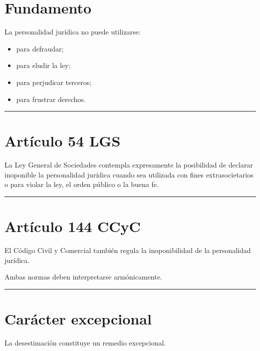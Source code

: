 \documentclass[
  spanish,
  letterpaper,
  DIV=11,
  numbers=noendperiod]{scrartcl}
\providecommand{\tightlist}{%
  \setlength{\itemsep}{0pt}\setlength{\parskip}{0pt}}
\begin{document}
\section{Fundamento}\label{fundamento}

La personalidad jurídica no puede utilizarse:

\begin{itemize}
\tightlist
\item
  para defraudar;
\item
  para eludir la ley;
\item
  para perjudicar terceros;
\item
  para frustrar derechos.
\end{itemize}

\begin{center}\rule{0.5\linewidth}{0.5pt}\end{center}

\section{Artículo 54 LGS}\label{artuxedculo-54-lgs}

La Ley General de Sociedades contempla expresamente la posibilidad de
declarar inoponible la personalidad jurídica cuando sea utilizada con
fines extrasocietarios o para violar la ley, el orden público o la buena
fe.

\begin{center}\rule{0.5\linewidth}{0.5pt}\end{center}

\section{Artículo 144 CCyC}\label{artuxedculo-144-ccyc}

El Código Civil y Comercial también regula la inoponibilidad de la
personalidad jurídica.

Ambas normas deben interpretarse armónicamente.

\begin{center}\rule{0.5\linewidth}{0.5pt}\end{center}

\section{Carácter excepcional}\label{caruxe1cter-excepcional}

La desestimación constituye un remedio excepcional.
\end{document}

